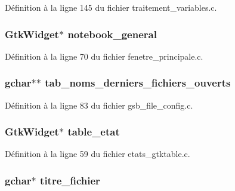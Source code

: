 Définition à la ligne 145 du fichier traitement\_\-variables.c.

\subsubsection[{notebook\_\-general}]{\setlength{\rightskip}{0pt plus 5cm}GtkWidget$\ast$ {\bf notebook\_\-general}}\label{gsb__file_8c_a8924516aa4170f932308e93cf93a785b}


Définition à la ligne 70 du fichier fenetre\_\-principale.c.

\subsubsection[{tab\_\-noms\_\-derniers\_\-fichiers\_\-ouverts}]{\setlength{\rightskip}{0pt plus 5cm}gchar$\ast$$\ast$ {\bf tab\_\-noms\_\-derniers\_\-fichiers\_\-ouverts}}\label{gsb__file_8c_a29a380dfbc7b7bc62547a1c0f5d95ff4}


Définition à la ligne 83 du fichier gsb\_\-file\_\-config.c.

\subsubsection[{table\_\-etat}]{\setlength{\rightskip}{0pt plus 5cm}GtkWidget$\ast$ {\bf table\_\-etat}}\label{gsb__file_8c_a8acf276de2f2a805f29b0ab451bbcc6a}


Définition à la ligne 59 du fichier etats\_\-gtktable.c.

\subsubsection[{titre\_\-fichier}]{\setlength{\rightskip}{0pt plus 5cm}gchar$\ast$ {\bf titre\_\-fichier}}\label{gsb__file_8c_a787cc81cf2ad728775b73d723713980b}


